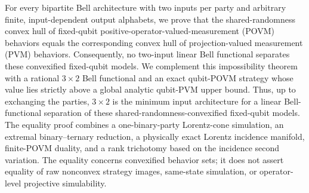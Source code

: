 For every bipartite Bell architecture with two inputs per party and arbitrary
finite, input-dependent output alphabets, we prove that the shared-randomness
convex hull of fixed-qubit positive-operator-valued-measurement (POVM)
behaviors equals the corresponding convex hull of projection-valued
measurement (PVM) behaviors. Consequently, no two-input linear Bell
functional separates these convexified fixed-qubit models. We complement this
impossibility theorem with a rational \(3\times2\) Bell functional and an
exact qubit-POVM strategy whose value lies strictly above a global analytic
qubit-PVM upper bound. Thus, up to exchanging the parties, \(3\times2\) is the
minimum input architecture for a linear Bell-functional separation of these
shared-randomness-convexified fixed-qubit models. The equality proof combines
a one-binary-party Lorentz-cone simulation, an extremal binary--ternary
reduction, a physically exact Lorentz incidence manifold, finite-POVM
duality, and a rank trichotomy based on the incidence second variation. The
equality concerns convexified behavior sets; it does not assert equality of
raw nonconvex strategy images, same-state simulation, or operator-level
projective simulability.
